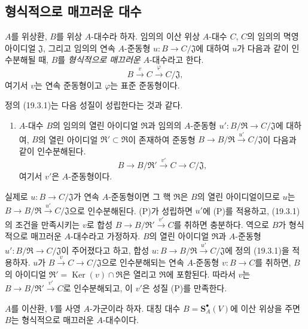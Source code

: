 \subsection{형식적으로 매끄러운 대수}
\label{subsection:0.19.3-fr}

\begin{definition}[19.3.1]
\label{0.19.3.1-fr}
$A$를 위상환, $B$를 위상 $A$-대수라 하자. 임의의 이산 위상
$A$-대수 $C$, $C$의 임의의 멱영 아이디얼 $\mathfrak J$, 그리고 임의의
연속 $A$-준동형 $u:B\to C/\mathfrak J$에 대하여 $u$가 다음과 같이
인수분해될 때, $B$를 \emph{형식적으로 매끄러운} $A$-대수라고 한다.
\[
  B\xrightarrow{v}C\xrightarrow{\varphi}C/\mathfrak J,
\]
여기서 $v$는 연속 준동형이고 $\varphi$는 표준 준동형이다.
\end{definition}


정의 (19.3.1)는 다음 성질이 성립한다는 것과 같다.
\begin{enumerate}
  \item[(P)] $A$-대수 $B$의 임의의 열린 아이디얼 $\mathfrak R$과
  임의의 $A$-준동형 $u':B/\mathfrak R\to C/\mathfrak J$에 대하여,
  $B$의 열린 아이디얼 $\mathfrak R'\subset\mathfrak R$이 존재하여
  준동형 $B\to B/\mathfrak R\xrightarrow{u'}C/\mathfrak J$이 다음과
  같이 인수분해된다.
  \[
    B\to B/\mathfrak R'\xrightarrow{v'}C\to C/\mathfrak J,
  \]
  여기서 $v'$은 $A$-준동형이다.
\end{enumerate}
실제로 $u:B\to C/\mathfrak J$가 연속 $A$-준동형이면 그 핵
$\mathfrak R$은 $B$의 열린 아이디얼이므로 $u$는
$B\to B/\mathfrak R\xrightarrow{u'}C/\mathfrak J$으로 인수분해된다.
(P)가 성립하면 $u'$에 (P)를 적용하고, (19.3.1)의 조건을 만족시키는
$v$로 합성 $B\to B/\mathfrak R'\xrightarrow{v'}C$를 취하면 충분하다.
역으로 $B$가 형식적으로 매끄러운 $A$-대수라고 가정하자. $B$의 열린
아이디얼 $\mathfrak R$과 $A$-준동형
$u':B/\mathfrak R\to C/\mathfrak J$이 주어졌다고 하고, 합성
$u:B\to B/\mathfrak R\xrightarrow{u'}C/\mathfrak J$에 정의 (19.3.1)을
적용하자. $u$가
$B\xrightarrow{v}C\to C/\mathfrak J$으로 인수분해되는 연속
$A$-준동형 $v:B\to C$를 취하면, $B$의 아이디얼
$\mathfrak R'=\operatorname{Ker}(v)\cap\mathfrak R$은 열리고
$\mathfrak R$에 포함된다. 따라서 $v$는
$B\to B/\mathfrak R'\xrightarrow{v'}C$로 인수분해되고, 이 $v'$은
성질 (P)를 만족한다.

\begin{proposition}[19.3.2]
\label{0.19.3.2-fr}
$A$를 이산환, $V$를 사영 $A$-가군이라 하자. 대칭 대수
$B=\mathbf S_A^\bullet(V)$에 이산 위상을 주면 $B$는 형식적으로
매끄러운 $A$-대수이다.
\end{proposition}

